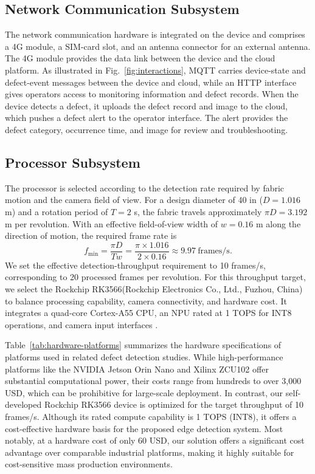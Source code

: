 \documentclass[journal]{IEEEtran}
\begin{document}
\subsection{Network Communication Subsystem}
The network communication hardware is integrated on the device and comprises a 4G module, a SIM-card slot, and an antenna connector for an external antenna. The 4G module provides the data link between the device and the cloud platform. As illustrated in Fig.~\ref{fig:interactions}, MQTT carries device-state and defect-event messages between the device and cloud, while an HTTP interface gives operators access to monitoring information and defect records. When the device detects a defect, it uploads the defect record and image to the cloud, which pushes a defect alert to the operator interface. The alert provides the defect category, occurrence time, and image for review and troubleshooting. 

\subsection{Processor Subsystem}
\label{sec:coverage}
The processor is selected according to the detection rate required by fabric motion and the camera field of view. For a design diameter of 40 in ($D=1.016$ m) and a rotation period of $T=2$ s, the fabric travels approximately $\pi D=3.192$ m per revolution. With an effective field-of-view width of $w=0.16$ m along the direction of motion, the required frame rate is
\begin{equation}
f_{\min}=\frac{\pi D}{Tw}
=\frac{\pi\times1.016}{2\times0.16}
\approx9.97\ \mathrm{frames/s}.
\label{eq:coverage-rate}
\end{equation}
We set the effective detection-throughput requirement to 10 frames/s, corresponding to 20 processed frames per revolution. For this throughput target, we select the Rockchip RK3566(Rockchip Electronics Co., Ltd., Fuzhou, China) to balance processing capability, camera connectivity, and hardware cost. It integrates a quad-core Cortex-A55 CPU, an NPU rated at 1 TOPS for INT8 operations, and camera input interfaces \cite{rockchiprk3566}. 

Table~\ref{tab:hardware-platforms} summarizes the hardware specifications of platforms used in related defect detection studies. While high-performance platforms like the NVIDIA Jetson Orin Nano and Xilinx ZCU102 offer substantial computational power, their costs range from hundreds to over 3,000 USD, which can be prohibitive for large-scale deployment. In contrast, our self-developed Rockchip RK3566 device is optimized for the target throughput of 10 frames/s. Although its rated compute capability is 1 TOPS (INT8), it offers a cost-effective hardware basis for the proposed edge detection system. Most notably, at a hardware cost of only 60 USD, our solution offers a significant cost advantage over comparable industrial platforms, making it highly suitable for cost-sensitive mass production environments.
\end{document}
